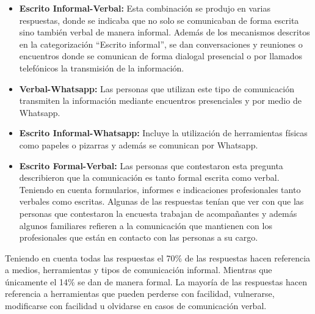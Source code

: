 \documentclass[a4paper,12pt]{article}
\begin{document}
    \begin{itemize}
        \item \textbf{Escrito Informal-Verbal:} Esta combinación se produjo en varias respuestas, donde se indicaba que no solo se comunicaban de forma escrita sino también verbal de manera informal. Además de los mecanismos descritos en la categorización “Escrito informal”, se dan conversaciones y reuniones o encuentros donde se comunican de forma dialogal presencial o por llamados telefónicos la transmisión de la información.
        \item \textbf{Verbal-Whatsapp:} Las personas que utilizan este tipo de comunicación transmiten la información mediante encuentros presenciales y por medio de Whatsapp.
        \item \textbf{Escrito Informal-Whatsapp:} Incluye la utilización de herramientas físicas como papeles o pizarras y además se comunican por Whatsapp.
        \item \textbf{Escrito Formal-Verbal:} Las personas que contestaron esta pregunta describieron que la comunicación es tanto formal escrita como verbal. Teniendo en cuenta formularios, informes e indicaciones profesionales tanto verbales como escritas. Algunas de las respuestas tenían que ver con que las personas que contestaron la encuesta trabajan de acompañantes y además algunos familiares refieren a la comunicación que mantienen con los profesionales que están en contacto con las personas a su cargo.
    \end{itemize}
    Teniendo en cuenta todas las respuestas el 70\% de las respuestas hacen referencia a medios, herramientas y tipos de comunicación informal. Mientras que únicamente el 14\% se dan de manera formal. \newline
    La mayoría de las respuestas hacen referencia a herramientas que pueden perderse con facilidad, vulnerarse, modificarse con facilidad u olvidarse en casos de comunicación verbal.
\end{document}

